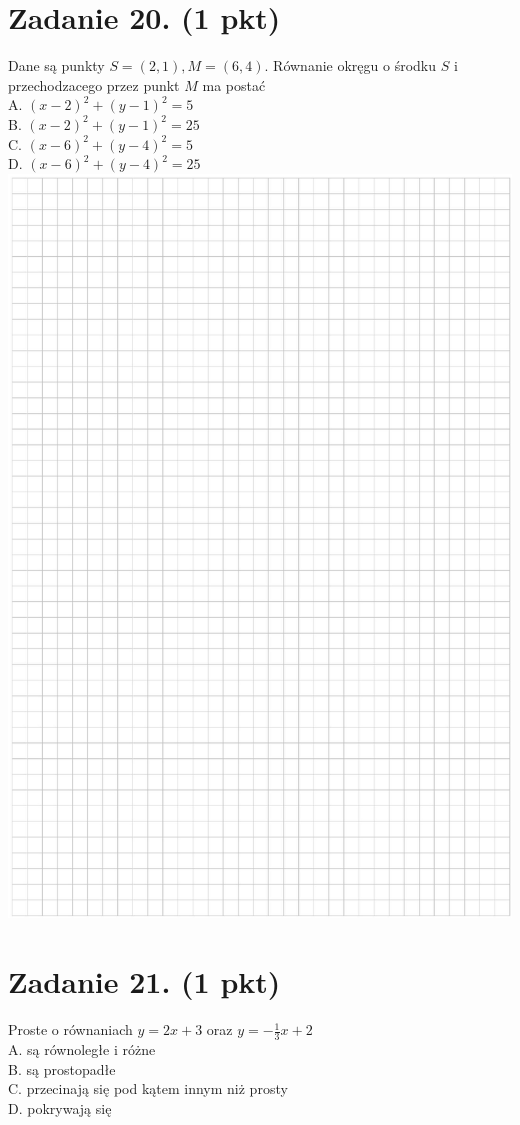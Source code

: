 \documentclass[10pt]{article}
\begin{document}
\section*{Zadanie 20. (1 pkt)}
Dane są punkty \(S=(2,1), M=(6,4)\). Równanie okręgu o środku \(S\) i przechodzacego przez punkt \(M\) ma postać\\
A. \((x-2)^{2}+(y-1)^{2}=5\)\\
B. \((x-2)^{2}+(y-1)^{2}=25\)\\
C. \((x-6)^{2}+(y-4)^{2}=5\)\\
D. \((x-6)^{2}+(y-4)^{2}=25\)\\
\includegraphics[max width=\textwidth, center]{2024_11_21_603d5c1b2a7d8d68f45fg-09}

\section*{Zadanie 21. (1 pkt)}
Proste o równaniach \(y=2 x+3\) oraz \(y=-\frac{1}{3} x+2\)\\
A. są równoległe i różne\\
B. są prostopadłe\\
C. przecinają się pod kątem innym niż prosty\\
D. pokrywają się
\end{document}
